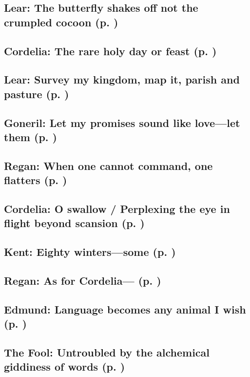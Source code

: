 \subsection{Lear: The butterfly shakes off not the crumpled cocoon (p. \pageref{ch:lear_aa})}

\subsection{Cordelia: The rare holy day or feast (p. \pageref{ch:lear_ab})}

\subsection{Lear: Survey my kingdom, map it, parish and pasture (p. \pageref{ch:lear_ac})}

\subsection{Goneril: Let my promises sound like love---let them (p. \pageref{ch:lear_ad})}

\subsection{Regan: When one cannot command, one flatters (p. \pageref{ch:lear_ae})}

\subsection{Cordelia: O swallow / Perplexing the eye in flight beyond scansion (p. \pageref{ch:lear_af})}

\subsection{Kent: Eighty winters---some (p. \pageref{ch:lear_ag})}

\subsection{Regan: As for Cordelia--- (p. \pageref{ch:lear_ah})}

\subsection{Edmund: Language becomes any animal I wish (p. \pageref{ch:lear_ai})}

\subsection{The Fool: Untroubled by the alchemical giddiness of words (p. \pageref{ch:lear_aj})}

